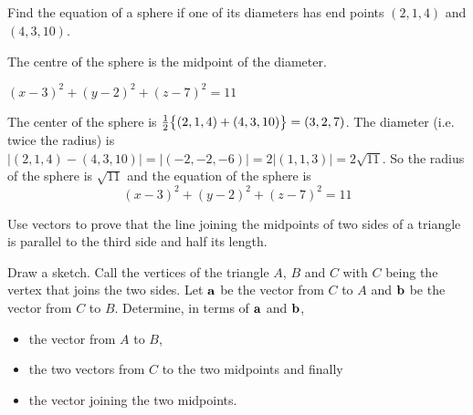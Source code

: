 
\subsection*{\Procedural}

\begin{question}
Find the equation of a sphere if one of its diameters has end
points $(2,1,4)$ and $(4,3,10)$.
\end{question}

\begin{hint}
The centre of the sphere is the midpoint of the diameter.
\end{hint}

\begin{answer}
$(x-3)^2+(y-2)^2+(z-7)^2=11$
\end{answer}

\begin{solution}
The center of the sphere is 
$\tfrac{1}{2}\big\{(2,1,4)+(4,3,10)\big\}=(3,2,7)$. The diameter (i.e. twice the radius) is $|(2,1,4)-(4,3,10)|=|(-2,-2,-6)|=2|(1,1,3)|=2\sqrt{11}$. So the radius of the sphere is $\sqrt{11}$ and
the equation of the sphere is
\begin{equation*}
(x-3)^2+(y-2)^2+(z-7)^2=11
\end{equation*}
\end{solution}


\begin{question}
Use vectors to prove that the line joining the midpoints of two sides
of a triangle is parallel to the third side  and half its length.
\end{question}

\begin{hint}
Draw a sketch.
Call the vertices of the triangle $A$, $B$ and $C$ with $C$ being the
vertex that joins the two sides. Let $\mathbf{a}$ be the vector from $C$ to $A$ 
and $\mathbf{b}$ be the vector from $C$ to $B$. Determine, in terms of $\mathbf{a}$ and 
$\mathbf{b}$, 
\begin{itemize}\itemsep0pt \parskip0pt  %

\item 
the vector from $A$ to $B$, 
\item
the two vectors from $C$ to the two midpoints and finally 
\item
the vector joining the two midpoints. 
\end{itemize}
\end{hint}


